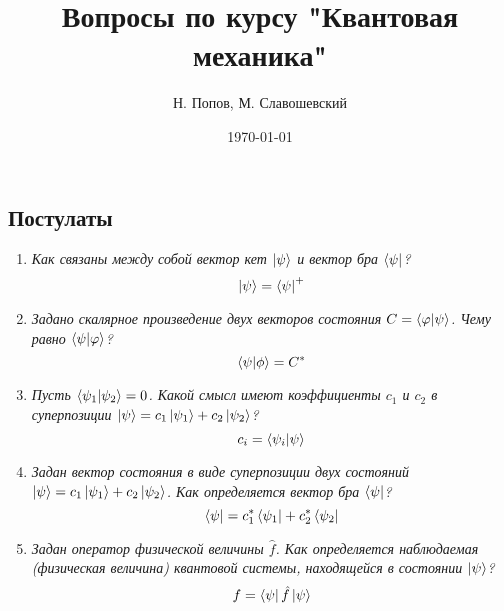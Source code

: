 \documentclass{article}
\begin{document}
\title{Вопросы по курсу "Квантовая механика"}
\author{Н. Попов, М. Славошевский}
\date{\today}
\maketitle

{}

\subsection*{Постулаты}
	\begin{enumerate}
		\item \textit{Как связаны между собой вектор кет $\ket{\psi}$ и вектор бра $\bra{\psi} $?}
		\begin{equation}
			\ket{\psi}=\bra{\psi}^{+}
		\end{equation}	
	\item \textit{Задано скалярное произведение двух векторов состояния $C =\braket{\varphi | \psi}$. Чему равно $\braket{\psi | \varphi}$?}
	\begin{equation}
		\braket{\psi|\phi}=C^{*}
	\end{equation}
	
	\item \textit{Пусть $\braket{\psi_1 | \psi_2} = 0$. Какой смысл имеют коэффициенты $c_1$ и $c_2$ в суперпозиции $\ket{\psi} = c_1 \ket{\psi_1} + c_2 \ket{\psi_2} $?}
	\begin{equation}
		c_{i}=\braket{\psi_{i}|\psi}
	\end{equation}
	\item \textit{Задан вектор состояния в виде суперпозиции двух состояний $\ket{\psi} = c_1 \ket{\psi_1} + c_2 \ket{\psi_2}$. Как
определяется вектор бра $\bra{\psi}$?}
	\begin{equation}
		\bra{\psi}=c_{1}^{*}\bra{\psi_{1}}+c_{2}^{*}\bra{\psi_{2}}
	\end{equation}
	\item \textit{Задан оператор физической величины $\hat{f}$. Как определяется наблюдаемая (физическая величина) квантовой системы, находящейся в состоянии $\ket{\psi}$?
}	
	\begin{equation}
		f=\bra{\psi}\hat{f}\ket{\psi}
	\end{equation}
	
	\end{enumerate}
\end{document}
